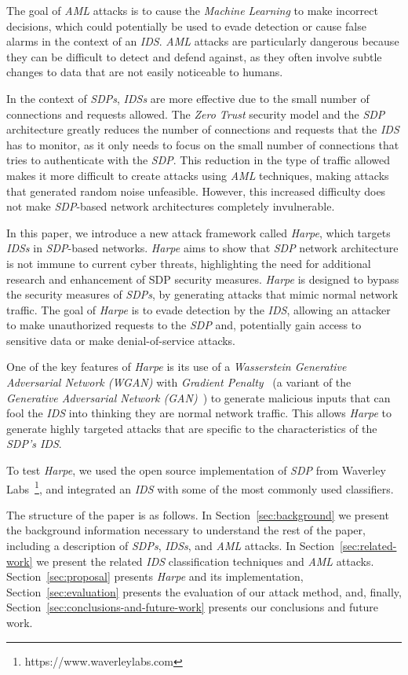 The goal of \textit{AML} attacks is to cause the \textit{Machine Learning} to make incorrect decisions, which could
potentially be used to evade detection or cause false alarms in the context of an \textit{IDS}.
\textit{AML} attacks are particularly dangerous because they can be difficult to detect and defend against, as they
often involve subtle changes to data that are not easily noticeable to humans.

In the context of \textit{SDPs}, \textit{IDSs} are more effective due to the small number of connections and requests
allowed.
The \textit{Zero Trust} security model and the \textit{SDP} architecture  greatly reduces the number of connections and
requests that the \textit{IDS} has to monitor, as it only needs to focus on the small number of connections that
tries to authenticate with the \textit{SDP}.
This reduction in the type of traffic allowed makes it more difficult to create attacks using \textit{AML} techniques,
making attacks that generated random noise unfeasible.
However, this increased difficulty does not make \textit{SDP}-based network architectures completely invulnerable.

In this paper, we introduce a new attack framework called \textit{Harpe}, which targets \textit{IDSs} in
\textit{SDP}-based networks.
\textit{Harpe} aims to show that \textit{SDP} network architecture is not immune to current cyber threats,
highlighting the need for additional research and enhancement of SDP security measures.
\textit{Harpe} is designed to bypass the security measures of \textit{SDPs}, by generating attacks that mimic normal
network traffic.
The goal of \textit{Harpe} is to evade detection by the \textit{IDS}, allowing an attacker to make unauthorized
requests to the \textit{SDP} and, potentially gain access to sensitive data or make denial-of-service attacks.

One of the key features of \textit{Harpe} is its use of a \textit{Wasserstein Generative Adversarial Network (WGAN)}
with \textit{Gradient Penalty}~\cite{gulrajani2017improved} (a variant of the
\textit{Generative Adversarial Network (GAN)}~\cite{goodfellow2020generative}) to generate malicious inputs that can
fool the \textit{IDS} into thinking they are normal network traffic.
This allows \textit{Harpe} to generate highly targeted attacks that are specific to the characteristics of the
\textit{SDP's IDS}.

To test \textit{Harpe}, we used the open source implementation of \textit{SDP} from Waverley
Labs~\footnote{https://www.waverleylabs.com}, and integrated an \textit{IDS} with some of the most commonly used
classifiers.

The structure of the paper is as follows.
In Section~\ref{sec:background} we present the background information necessary to understand the rest of the paper,
including a description of \textit{SDPs}, \textit{IDSs}, and \textit{AML} attacks.
In Section~\ref{sec:related-work} we present the related \textit{IDS} classification techniques and \textit{AML}
attacks.
Section~\ref{sec:proposal} presents \textit{Harpe} and its implementation, Section~\ref{sec:evaluation} presents the
evaluation of our attack method, and, finally, Section~\ref{sec:conclusions-and-future-work} presents our conclusions
and future work.